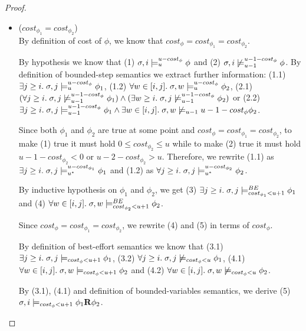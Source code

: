 \begin{theorem}
\begin{proof}
\begin{itemize}
\begin{itemize}
\begin{itemize}
            \item ($cost_{\phi_1} = cost_{\phi_2}$) \\
            By definition of cost of $\phi$, we know that $cost_\phi = cost_{\phi_1} = cost_{\phi_2}$.
            
            By hypothesis we know that 
            (1) $\sigma, i \models_{u}^{u-cost_\phi} \phi$ and 
            (2) $\sigma, i \not\models_{u-1}^{u-1-cost_\phi} \phi$.
            By definition of bounded-step semantics we extract further information: 
            (1.1) $\exists j \geq i.\; \sigma,j \models_{u}^{u-cost_\phi} \phi_1$,
            (1.2) $\forall w \in [i,j].\; \sigma,w \models_{u}^{u-cost_\phi} \phi_2$, 
            (2.1) $(\forall j \geq i.\; \sigma,j \not\models_{u-1}^{u-1-cost_\phi} \phi_1) \land (\exists w \geq i.\; \sigma,j \not\models_{u-1}^{u-1-cost_\phi} \phi_2)$ or 
            (2.2) $\exists j \geq i.\; \sigma,j \models_{u-1}^{u-1-cost_\phi} \phi_1 \land \exists w \in [i,j].\; \sigma,w \not\models_{u-1}{u-1-cost_\phi} \phi_2$.

            Since both $\phi_1$ and $\phi_2$ are true at some point and $cost_\phi = cost_{\phi_1} = cost_{\phi_2}$, to make (1) true it must hold $0 \leq cost_{\phi_2} \leq u$ while to make (2) true it must hold $u-1-cost_{\phi_2} < 0$ or $u-2-cost_{\phi_2} > u$.
            Therefore, we rewrite (1.1) as $\exists j \geq i.\; \sigma,j \models_{{u}^*}^{u-cost_{\phi_1}} \phi_1$ and (1.2) as $\forall j \geq i.\; \sigma, j \models_{{u}^*}^{u-cost_{\phi_2}} \phi_2$.

            By inductive hypothesis on $\phi_1$ and $\phi_2$, we get (3) $\exists j \geq i.\; \sigma,j \models_{cost_{\phi_1} < u + 1}^{BE} \phi_1$ and (4) $\forall w \in [i,j].\; \sigma,w \models_{cost_{\phi_2} < u + 1}^{BE} \phi_2$.

            Since $cost_\phi = cost_{\phi_1} = cost_{\phi_2}$, we rewrite (4) and (5) in terms of $cost_\phi$.

            By definition of best-effort semantics we know that 
            (3.1) $\exists j \geq i.\; \sigma,j \models_{cost_\phi < u + 1} \phi_1$,
            (3.2) $\forall j \geq i.\; \sigma,j \not\models_{cost_\phi < u} \phi_1$,
            (4.1) $\forall w \in [i,j].\; \sigma,w \models_{cost_\phi < u + 1} \phi_2$ and 
            (4.2) $\forall w \in [i,j].\; \sigma,w \not\models_{cost_\phi < u} \phi_2$.

            By (3.1), (4.1) and definition of bounded-variables semantics, we derive (5) $\sigma,i \models_{cost_\phi < u + 1} \phi_1 \mathbf{R} \phi_2$.


\end{itemize}
\end{itemize}
\end{itemize}
\end{proof}
\end{theorem}
